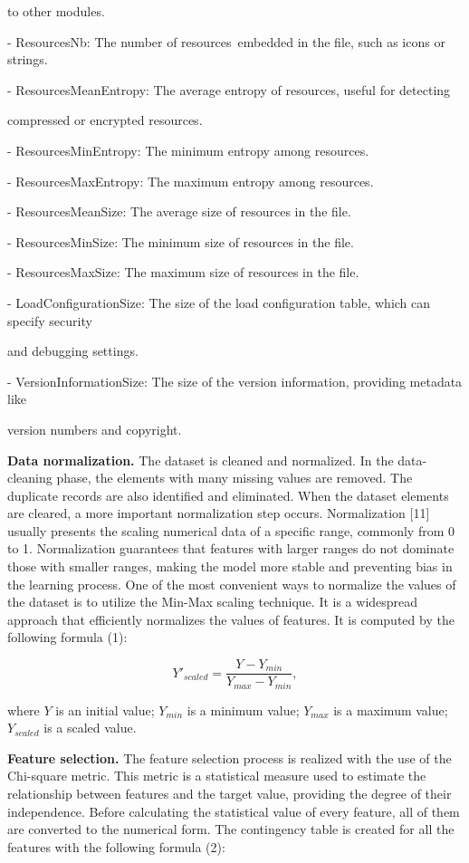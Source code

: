 \begin{multicols}{2}
to other modules.

- ResourcesNb: The number of resources~embedded in the file, such as
icons or strings.

- ResourcesMeanEntropy: The average entropy of resources, useful for
detecting

compressed or encrypted resources.

- ResourcesMinEntropy: The minimum entropy among resources.

- ResourcesMaxEntropy: The maximum entropy among resources.

- ResourcesMeanSize: The average size of resources in the file.

- ResourcesMinSize: The minimum size of resources in the file.

- ResourcesMaxSize: The maximum size of resources in the file.

- LoadConfigurationSize: The size of the load configuration table, which
can specify security

and debugging settings.

- VersionInformationSize: The size of the version information, providing
metadata like

version numbers and copyright.

{\bfseries Data normalization.} The dataset is cleaned and normalized. In
the data-cleaning phase, the elements with many missing values are
removed. The duplicate records are also identified and eliminated. When
the dataset elements are cleared, a more important normalization step
occurs. Normalization {[}11{]} usually presents the scaling numerical
data of a specific range, commonly from 0 to 1. Normalization guarantees
that features with larger ranges do not dominate those with smaller
ranges, making the model more stable and preventing bias in the learning
process. One of the most convenient ways to normalize the values of the
dataset is to utilize the Min-Max scaling technique. It is a widespread
approach that efficiently normalizes the values of features. It is
computed by the following formula (1):

\begin{equation}
Y'_{scaled}=\frac{Y-Y_{min}}{Y_{max}-Y_{min}},
\end{equation}

where $Y$ is an initial value; $Y_{min}$ is a minimum value; $Y_{max}$ is a maximum value; $Y_{scaled}$ is a scaled value.

{\bfseries Feature selection.} The feature selection process is realized
with the use of the Chi-square metric. This metric is a statistical
measure used to estimate the relationship between features and the
target value, providing the degree of their independence. Before
calculating the statistical value of every feature, all of them are
converted to the numerical form. The contingency table is created for
all the features with the following formula (2):


\end{multicols}
